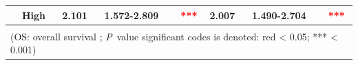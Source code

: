 \documentclass[jpm,article,submit,moreauthors,pdftex]{Definitions/mdpi}
\begin{document}
\begin{table}[hbt!]
{\begin{tabular}{|l|l|l|l|l|l|l|l|}
\cline{2-8}
                                        & High                                                                                & 2.101                                                                          & 1.572-2.809                                                                   & \multicolumn{1}{c|}{\textcolor{red}{***}}                                     & 2.007                                                                          & 1.490-2.704                                                                   & \multicolumn{1}{c|}{\textcolor{red}{***}}                                      \\ 
\hline
\multicolumn{8}{|l|}{}                                                                                                                                                                                                                                                                                                                                                                                                                                                                                                                                                                                                           \\ 
\hline
\multicolumn{8}{|l|}{(OS: overall survival ; \textit{P}~value significant codes is denoted: red \textless{} 0.05; *** \textless{} 0.001)}                                                                                                                                                                                                                                                                                                                                                                                                                                                                                                               \\
\hline
\end{tabular}
} %
{}
\label{table:table2}
\end{table}

\clearpage


\end{document}
